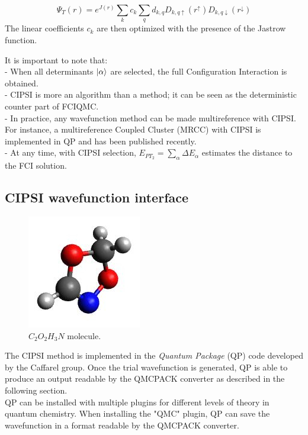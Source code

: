 \begin{equation}
\Psi_T(r)=e^{J(r)}\sum_k c_k \sum_q d_{k,q}D_{k,q\uparrow } (r^{\uparrow})D_{k,q\downarrow}(r^{\downarrow})
\end{equation}
The linear coefficients $c_k$ are then optimized with the presence of the Jastrow function. 

It is important to note that:\\
- When all determinants $\ket{\alpha}$ are selected, the full Configuration Interaction is obtained.\\
- CIPSI is more an algorithm than a method; it can be seen as the deterministic counter part of FCIQMC. \\
- In practice, any wavefunction method can be made multireference with CIPSI. For instance, a multireference Coupled Cluster (MRCC) with CIPSI is implemented in QP and has been published recently.\cite{Garniron2017}\\
- At any time, with CIPSI selection, $E_{PT_2}=\sum_\alpha \Delta E_\alpha$ estimates the distance to the FCI solution.



\subsection{CIPSI wavefunction interface}
\label{sec:cipsi}


\begin{figure}
\begin{center}
\includegraphics[trim = 0mm 0mm 0mm 0mm, clip,width=0.3\columnwidth]{figures/Reactant.jpg}
\end{center}
\caption{$C_2O_2H_3N$ molecule.
\label{fig:C2O2H3N}
}
\end{figure}
The CIPSI method
is implemented in the \textit{Quantum Package} (QP) code\cite{QP} developed by the Caffarel group. Once the trial wavefunction is generated, QP is able to produce an output readable by the QMCPACK converter as described in the following section.\\
QP can be installed with multiple plugins for different levels of theory in quantum chemistry. When installing the "QMC" plugin, QP can save the wavefunction in a format readable by the QMCPACK converter. \\

